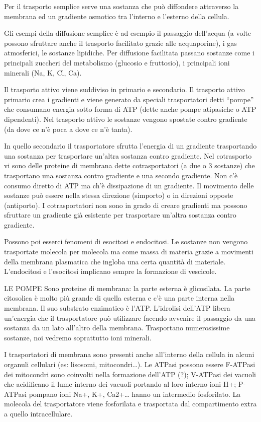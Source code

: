 \documentclass[]{article}
\begin{document}
Per il trasporto semplice serve una sostanza che può diffondere
attraverso la membrana ed un gradiente osmotico tra l'interno e
l'esterno della cellula.

Gli esempi della diffusione semplice è ad esempio il passaggio
dell'acqua (a volte possono sfruttare anche il trasporto facilitato
grazie alle acquaporine), i gas atmosferici, le sostanze lipidiche. Per
diffusione facilitata passano sostanze come i principali zuccheri del
metabolismo (glucosio e fruttosio), i principali ioni minerali (Na, K,
Cl, Ca).

Il trasporto attivo viene suddiviso in primario e secondario. Il
trasporto attivo primario crea i gradienti e viene generato da speciali
trasportatori detti ``pompe'' che consumano energia sotto forma di ATP
(dette anche pompe atipasiche o ATP dipendenti). Nel trasporto attivo le
sostanze vengono spostate contro gradiente (da dove ce n'è poca a dove
ce n'è tanta).

In quello secondario il trasportatore sfrutta l'energia di un gradiente
trasportando una sostanza per trasportare un'altra sostanza contro
gradiente. Nel cotrasporto vi sono delle proteine di membrana dette
cotrasportatori (a due o 3 sostanze) che trasportano una sostanza contro
gradiente e una secondo gradiente. Non c'è consumo diretto di ATP ma
ch'è dissipazione di un gradiente. Il movimento delle sostanze può
essere nella stessa direzione (simporto) o in direzioni opposte
(antiporto). I cotrasportatori non sono in grado di creare gradienti ma
possono sfruttare un gradiente già esistente per trasportare un'altra
sostanza contro gradiente.

Possono poi esserci fenomeni di esocitosi e endocitosi. Le sostanze non
vengono trasportate molecola per molecola ma come massa di materia
grazie a movimenti della membrana plasmatica che ingloba una certa
quantità di materiale. L'endocitosi e l'esocitosi implicano sempre la
formazione di vescicole.

LE POMPE Sono proteine di membrana: la parte esterna è glicosilata. La
parte citosolica è molto più grande di quella esterna e c'è una parte
interna nella membrana. Il suo substrato enzimatico è l'ATP. L'idrolisi
dell'ATP libera un'energia che il trasportatore può utilizzare facendo
avvenire il passaggio da una sostanza da un lato all'altro della
membrana. Trasportano numerosissime sostanze, noi vedremo soprattutto
ioni minerali.

I trasportatori di membrana sono presenti anche all'interno della
cellula in alcuni organuli cellulari (es: lisosomi, mitocondri\ldots{}).
Le ATPasi possono essere F-ATPasi dei mitocondri sono coinvolti nella
formazione dell'ATP (?); V-ATPasi dei vacuoli che acidificano il lume
interno dei vacuoli portando al loro interno ioni H+; P-ATPasi pompano
ioni Na+, K+, Ca2+\ldots{} hanno un intermedio fosforilato. La molecola
del trasportatore viene fosforilata e trasportata dal compartimento
extra a quello intracellulare.
\end{document}
